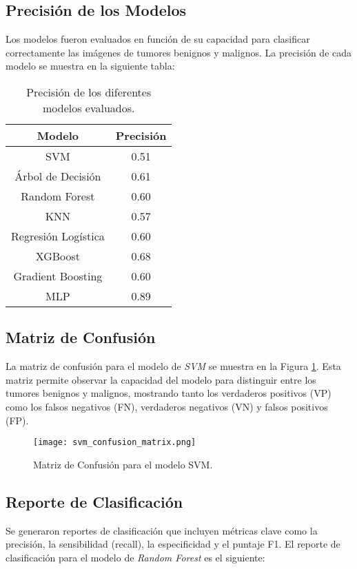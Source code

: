 \documentclass[12pt]{article}
\begin{document}
\subsection{Precisión de los Modelos}
Los modelos fueron evaluados en función de su capacidad para clasificar correctamente las imágenes de tumores benignos y malignos. La precisión de cada modelo se muestra en la siguiente tabla:

\begin{table}[h]
\centering
\begin{tabular}{|c|c|}
\hline
\textbf{Modelo} & \textbf{Precisión} \\
\hline
SVM & 0.51\\
Árbol de Decisión & 0.61\\
Random Forest & 0.60\\
KNN & 0.57\\
Regresión Logística & 0.60\\
XGBoost & 0.68\\
Gradient Boosting & 0.60\\
MLP & 0.89 \\
\hline
\end{tabular}
\caption{Precisión de los diferentes modelos evaluados.}
\end{table}

\subsection{Matriz de Confusión}
La matriz de confusión para el modelo de \textit{SVM} se muestra en la Figura \ref{fig:svm_cm}. Esta matriz permite observar la capacidad del modelo para distinguir entre los tumores benignos y malignos, mostrando tanto los verdaderos positivos (VP) como los falsos negativos (FN), verdaderos negativos (VN) y falsos positivos (FP).

\begin{figure}[h]
    \centering
    \texttt{[image: svm\_confusion\_matrix.png]}
    \caption{Matriz de Confusión para el modelo SVM.}
    \label{fig:svm_cm}
\end{figure}

\subsection{Reporte de Clasificación}
Se generaron reportes de clasificación que incluyen métricas clave como la precisión, la sensibilidad (recall), la especificidad y el puntaje F1. El reporte de clasificación para el modelo de \textit{Random Forest} es el siguiente:
\end{document}
